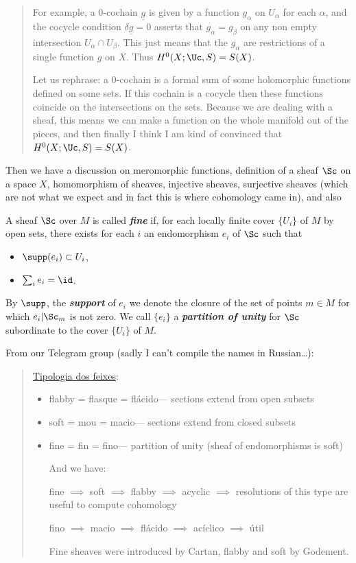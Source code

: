 \begin{quote}
	For example, a 0-cochain $\underline{g}$ is given by a function $g_\alpha$ on $U_\alpha$ for each $\alpha$, and the cocycle condition $\delta\underline{g}=0$ asserts that $g_\alpha=g_\beta$ on any non empty intersection $U_\alpha\cap U_\beta$. This just means that the $g_\alpha$ are restrictions of a single function $g$ on $X$. Thus $H^0(X;\Uc,S)=S(X)$.
	
	{\color{cyan}Let us rephrase: a 0-cochain is a formal sum of some holomorphic functions defined on some sets. If this cochain is a cocycle then these functions coincide on the intersections on the sets. Because we are dealing with a sheaf, this means we can make a function on the whole manifold out of the pieces,} {\color{magenta}and then finally I think I am kind of convinced that $H^0(X;\Uc,S)=S(X)$.}
\end{quote}
{\color{cyan}Then we have a discussion on meromorphic functions, definition of a sheaf $\Sc$ on a space $X$, homomorphism of sheaves, injective sheaves, surjective sheaves (which are not what we expect and in fact this is where cohomology came in), and also}
\begin{defn}
	A sheaf $\Sc$ over $M$ is called \textbf{\textit{fine}} if, for each locally finite cover $\{U_i\}$ of $M$ by open sets, there exists for each $i$ an endomorphism $e_i$ of $\Sc$ such that
	\begin{itemize}
		\item $\supp(e_i)\subset U_i$,
		\item $\sum_ie_i=\id$.
	\end{itemize}
	By $\supp$, the \textbf{\textit{support}} of $e_i$ we denote the closure of the set of points $m\in M$ for which $e_i|\Sc_m$ is not zero. We call $\{e_i\}$ a \textbf{\textit{partition of unity}} for $\Sc$ subordinate to the cover $\{U_i\}$ of $M$.
\end{defn}
From our Telegram group (sadly I can't compile the names in Russian…):
\begin{quote}
	\href{https://fr.wikipedia.org/wiki/Faisceau_(mathématiques)#Typologie_des_faisceaux}{Tipologia dos feixes}:
	\begin{itemize}
		\item flabby = flasque
			= flácido--- sections extend from open subsets
		\item soft = mou
			= macio--- sections extend from closed subsets
		\item fine = fin
	 		= fino--- partition of unity (sheaf of endomorphisms is soft)
	
	And we have:
	
	fine $\implies$ soft $\implies$ flabby $\implies$ acyclic $\implies$ resolutions of this type are useful to compute cohomology
	
	fino $\implies$ macio $\implies$ flácido $\implies$ acíclico $\implies$ útil

	Fine sheaves were introduced by Cartan, flabby and soft by Godement.
	\end{itemize}
\end{quote}

